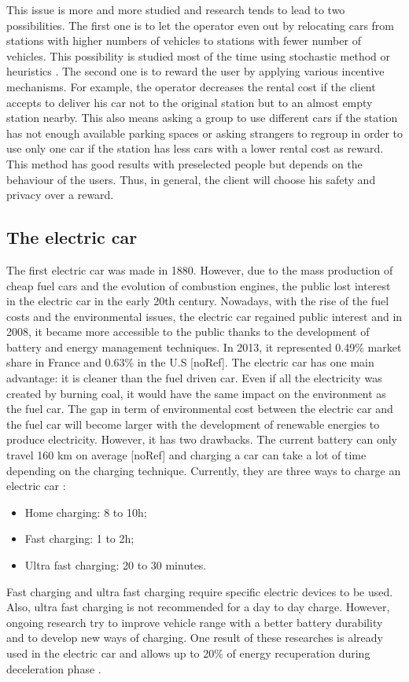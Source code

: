 \begin{bibunit}[ieeetr]
This issue is more and more studied and research tends to lead to two possibilities.
The first one is to let the operator even out by relocating cars from stations with higher numbers of vehicles to stations with fewer number of vehicles.
This possibility is studied most of the time using stochastic method \cite{fan_optimizing_2014} or heuristics \cite{duron_analysis_2000}.
The second one is to reward the user by applying various incentive mechanisms.
For example, the operator decreases the rental cost if the client accepts to deliver his car not to the original station but to an almost empty station nearby.
This also means asking a group to use different cars if the station has not enough available parking spaces or asking strangers to regroup in order to use only one car if the station has less cars with a lower rental cost as reward.
This method has good results with preselected people but depends on the behaviour of the users.
Thus, in general, the client will choose his safety and privacy over a reward.

\subsection{The electric car}
The first electric car was made in 1880.
However, due to the mass production of cheap fuel cars and the evolution of combustion engines, the public lost interest in the electric car in the early 20th century.
Nowadays, with the rise of the fuel costs and the environmental issues, the electric car regained public interest and in 2008, it became more accessible to the public thanks to the development of battery and energy management techniques. 
In 2013, it represented 0.49\% market share in France and 0.63\% in the U.S [noRef].  
The electric car has one main advantage: it is cleaner than the fuel driven car.
Even if all the electricity was created by burning coal, it would have the same impact on the environment as the fuel car.
The gap in term of environmental cost between the electric car and the fuel car will become larger with the development of renewable energies to produce electricity.
However, it has two drawbacks.
The current battery can only travel 160 km on average [noRef] and charging a car can take a lot of time depending on the charging technique.
Currently, they are three ways to charge an electric car \cite{livre_vert_ministere}:
\begin{itemize}
\item Home charging: 8 to 10h;
\item Fast charging: 1 to  2h;
\item Ultra fast charging: 20 to 30 minutes.
\end{itemize}
Fast charging and ultra fast charging require specific electric devices to be used.
Also, ultra fast charging is not recommended for a day to day charge.
However, ongoing research try to improve vehicle range with a better battery durability and to develop new ways of charging.
One result of these researches is already used in the electric car and allows up to 20\% of energy recuperation during deceleration phase \cite{artmeier_optimal_2010}.


\end{bibunit}
